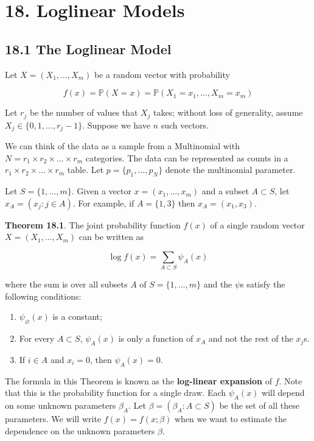 \section*{18. Loglinear Models}\label{loglinear-models}

\subsection*{18.1 The Loglinear Model}\label{the-loglinear-model}

Let \(X = (X_{1}, \dots, X_m)\) be a random vector with probability

\[ f(x) = \mathbb{P}(X = x) = \mathbb{P}(X_{1} = x_{1}, \dots, X_m = x_m) \]

Let \(r_{j}\) be the number of values that \(X_{j}\) takes; without loss of
generality, assume \(X_{j} \in \{ 0, 1, \dots, r_{j} - 1 \}\). Suppose we
have \(n\) such vectors.

We can think of the data as a sample from a Multinomial with
\(N = r_{1} \times r_{2} \times \dots \times r_m\) categories. The data can
be represented as counts in a \(r_{1} \times r_{2} \times \dots \times r_m\)
table. Let \(p = \{ p_{1}, \dots, p_N \}\) denote the multinomial
parameter.

Let \(S = \{ 1, \dots, m \}\). Given a vector \(x = (x_{1}, \dots, x_m)\)
and a subset \(A \subset S\), let \(x_A = (x_{j} : j \in A)\). For
example, if \(A = \{1, 3\}\) then \(x_A = (x_{1}, x_{3})\).

\textbf{Theorem 18.1}. The joint probability function \(f(x)\) of a
single random vector \(X = (X_{1}, \dots, X_m)\) can be written as

\[ \log f(x) = \sum_{A \subset S} \psi_A(x) \]

where the sum is over all subsets \(A\) of \(S = \{1, \dots, m \}\) and
the \(\psi\)s satisfy the following conditions:

\begin{enumerate}[tightlist,label={\arabic*.}]
\item
  \(\psi_\varnothing(x)\) is a constant;
\item
  For every \(A \subset S\), \(\psi_A(x)\) is only a function of \(x_A\)
  and not the rest of the \(x_{j}\)s.
\item
  If \(i \in A\) and \(x_{i} = 0\), then \(\psi_A(x) = 0\).
\end{enumerate}

The formula in this Theorem is known as the \textbf{log-linear
expansion} of \(f\). Note that this is the probability function for a
single draw. Each \(\psi_A(x)\) will depend on some unknown parameters
\(\beta_A\). Let \(\beta = (\beta_A : A \subset S)\) be the set of all
these parameters. We will write \(f(x) = f(x; \beta)\) when we want to
estimate the dependence on the unknown parameters \(\beta\).

